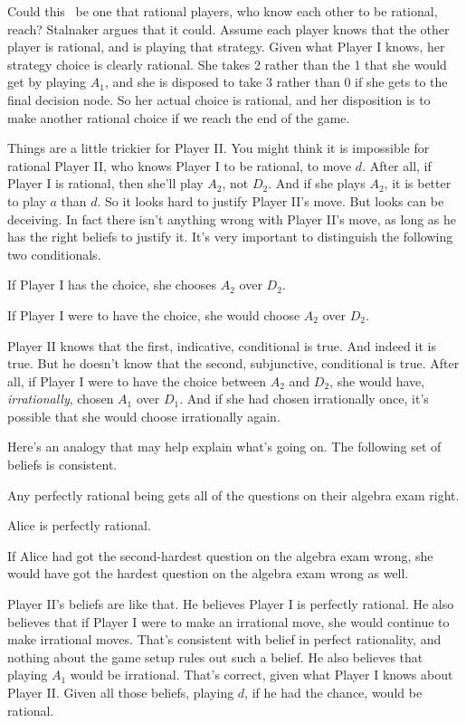 Could this \eqm\ be one that rational players, who know each other to be rational, reach? Stalnaker argues that it could. Assume each player knows that the other player is rational, and is playing that strategy. Given what Player I knows, her strategy choice is clearly rational. She takes 2 rather than the 1 that she would get by playing $A_1$, and she is disposed to take 3 rather than 0 if she gets to the final decision node. So her actual choice is rational, and her disposition is to make another rational choice if we reach the end of the game.

Things are a little trickier for Player II. You might think it is impossible for rational Player II, who knows Player I to be rational, to move $d$. After all, if Player I is rational, then she'll play $A_2$, not $D_2$. And if she plays $A_2$, it is better to play $a$ than $d$. So it looks hard to justify Player II's move. But looks can be deceiving. In fact there isn't anything wrong with Player II's move, as long as he has the right beliefs to justify it. It's very important to distinguish the following two conditionals.

\begin{itemize*}
\item If Player I has the choice, she chooses $A_2$ over $D_2$.
\item If Player I were to have the choice, she would choose $A_2$ over $D_2$.
\end{itemize*}

\noindent Player II knows that the first, indicative, conditional is true. And indeed it is true. But he doesn't know that the second, subjunctive, conditional is true. After all, if Player I were to have the choice between $A_2$ and $D_2$, she would have, \textit{irrationally}, chosen $A_1$ over $D_1$. And if she had chosen irrationally once, it's possible that she would choose irrationally again.

Here's an analogy that may help explain what's going on. The following set of beliefs is consistent.
\begin{itemize*}
\item Any perfectly rational being gets all of the questions on their algebra exam right.
\item Alice is perfectly rational.
\item If Alice had got the second-hardest question on the algebra exam wrong, she would have got the hardest question on the algebra exam wrong as well.
\end{itemize*}
\noindent Player II's beliefs are like that. He believes Player I is perfectly rational. He also believes that if Player I were to make an irrational move, she would continue to make irrational moves. That's consistent with belief in perfect rationality, and nothing about the game setup rules out such a belief. He also believes that playing $A_1$ would be irrational. That's correct, given what Player I knows about Player II. Given all those beliefs, playing $d$, if he had the chance, would be rational.

